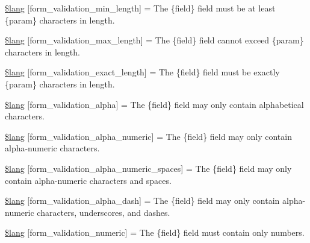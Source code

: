 \begin{DoxyCompactItemize}
\item 
\hyperlink{system_2language_2english_2form__validation__lang_8php_a8af94ce29e8a4ac82c976c891b51ffc9}{\$lang} \mbox{[}\textquotesingle{}form\+\_\+validation\+\_\+min\+\_\+length\textquotesingle{}\mbox{]} = \textquotesingle{}The \{field\} field must be at least \{param\} characters in length.\textquotesingle{}
\item 
\hyperlink{system_2language_2english_2form__validation__lang_8php_a16f2322f1cb6a1db7a2492d653559522}{\$lang} \mbox{[}\textquotesingle{}form\+\_\+validation\+\_\+max\+\_\+length\textquotesingle{}\mbox{]} = \textquotesingle{}The \{field\} field cannot exceed \{param\} characters in length.\textquotesingle{}
\item 
\hyperlink{system_2language_2english_2form__validation__lang_8php_ad6d3daf6617c3906bc88d6801e74c6c5}{\$lang} \mbox{[}\textquotesingle{}form\+\_\+validation\+\_\+exact\+\_\+length\textquotesingle{}\mbox{]} = \textquotesingle{}The \{field\} field must be exactly \{param\} characters in length.\textquotesingle{}
\item 
\hyperlink{system_2language_2english_2form__validation__lang_8php_a27ff6ba34db740db678c05baa95077bf}{\$lang} \mbox{[}\textquotesingle{}form\+\_\+validation\+\_\+alpha\textquotesingle{}\mbox{]} = \textquotesingle{}The \{field\} field may only contain alphabetical characters.\textquotesingle{}
\item 
\hyperlink{system_2language_2english_2form__validation__lang_8php_ad76e433e4991ed7404c0d44ab47119c0}{\$lang} \mbox{[}\textquotesingle{}form\+\_\+validation\+\_\+alpha\+\_\+numeric\textquotesingle{}\mbox{]} = \textquotesingle{}The \{field\} field may only contain alpha-\/numeric characters.\textquotesingle{}
\item 
\hyperlink{system_2language_2english_2form__validation__lang_8php_a8909b4a4c25b40e7ed1a27cc5b299d90}{\$lang} \mbox{[}\textquotesingle{}form\+\_\+validation\+\_\+alpha\+\_\+numeric\+\_\+spaces\textquotesingle{}\mbox{]} = \textquotesingle{}The \{field\} field may only contain alpha-\/numeric characters and spaces.\textquotesingle{}
\item 
\hyperlink{system_2language_2english_2form__validation__lang_8php_a95a401451435c56b9792be96ffa1bb36}{\$lang} \mbox{[}\textquotesingle{}form\+\_\+validation\+\_\+alpha\+\_\+dash\textquotesingle{}\mbox{]} = \textquotesingle{}The \{field\} field may only contain alpha-\/numeric characters, underscores, and dashes.\textquotesingle{}
\item 
\hyperlink{system_2language_2english_2form__validation__lang_8php_abfd87d5b6c986ce3d4c0498ade54b380}{\$lang} \mbox{[}\textquotesingle{}form\+\_\+validation\+\_\+numeric\textquotesingle{}\mbox{]} = \textquotesingle{}The \{field\} field must contain only numbers.\textquotesingle{}

\end{DoxyCompactItemize}
